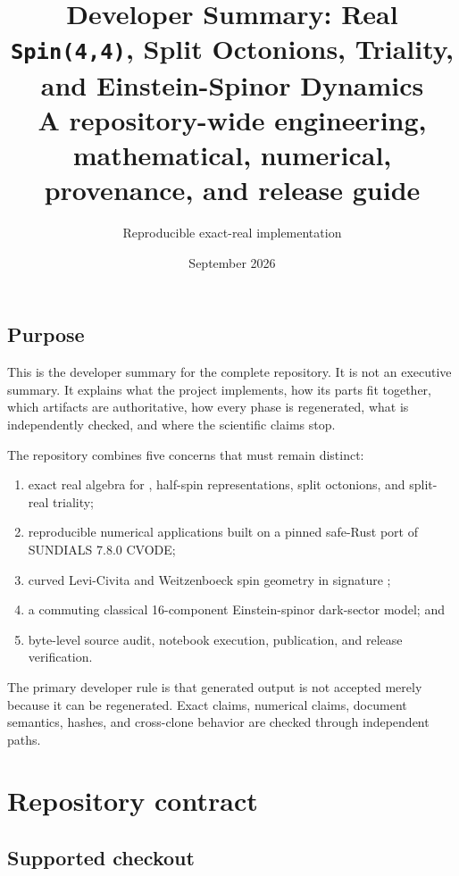 \documentclass[11pt]{article}
\title{Developer Summary: Real \texttt{Spin(4,4\allowbreak{})}, Split Octonions, Triality, and Einstein-Spinor Dynamics\\[0.5em]\large A repository-wide engineering, mathematical, numerical, provenance, and release guide}
\author{Reproducible exact-real implementation}
\date{September 2026}
\begin{document}
\maketitle
\tableofcontents
\newpage
\subsection{Purpose}

This is the developer summary for the complete \texttt{} repository. It is not an executive summary. It explains what the project implements, how its parts fit together, which artifacts are authoritative, how every phase is regenerated, what is independently checked, and where the scientific claims stop.

The repository combines five concerns that must remain distinct:

\begin{enumerate}
\item exact real algebra for \texttt{}, half-spin representations, split
octonions, and split-real triality;

\item reproducible numerical applications built on a pinned safe-Rust port of
SUNDIALS 7.8.0 CVODE;

\item curved Levi-Civita and Weitzenboeck spin geometry in signature \texttt{};
\item a commuting classical 16-component Einstein-spinor dark-sector model; and
\item byte-level source audit, notebook execution, publication, and release
verification.

\end{enumerate}

The primary developer rule is that generated output is not accepted merely because it can be regenerated. Exact claims, numerical claims, document semantics, hashes, and cross-clone behavior are checked through independent paths.

\section{Repository contract}

\subsection{Supported checkout}
\end{document}
